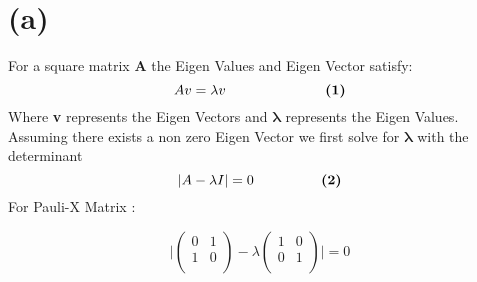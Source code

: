 \documentclass[a4paper, 12pt]{article}
\begin{document}
    \section*{\small(a)}
    \begin{flushleft}
        For a square matrix \textbf{A} the Eigen Values and Eigen Vector satisfy: \[Av = \lambda v \hspace{25mm} \textbf{(1)}\]
    \linebreak\hspace{10mm}Where  \textbf{v} represents the Eigen Vectors and $\boldsymbol{\lambda}$ represents the Eigen Values.
    \linebreak \\
    Assuming there exists a non zero Eigen Vector we first solve for $\boldsymbol{\lambda}$ with the determinant \[|A - \lambda I| = 0 \hspace{17mm} \textbf{(2)}\]
    For Pauli-X Matrix :

    \[\bigg|\begin{pmatrix}
        0 & 1  \\
        1 & 0  \\
    \end{pmatrix} - \lambda \begin{pmatrix}
        1 & 0 \\
        0 & 1 \\
    \end{pmatrix} \bigg| = 0 \]


\end{flushleft}
\end{document}

